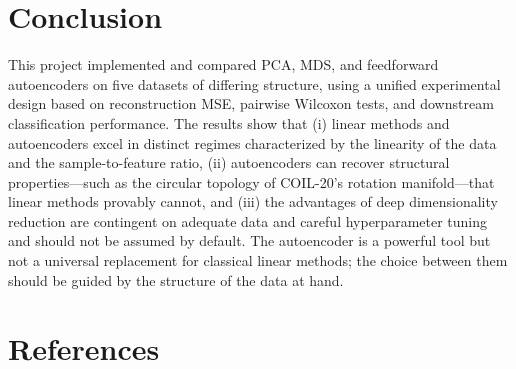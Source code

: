 \documentclass[11pt]{article}
\begin{document}
\section{Conclusion}

This project implemented and compared PCA, MDS, and feedforward autoencoders on five datasets of differing structure, using a unified experimental design based on reconstruction MSE, pairwise Wilcoxon tests, and downstream classification performance. The results show that (i) linear methods and autoencoders excel in distinct regimes characterized by the linearity of the data and the sample-to-feature ratio, (ii) autoencoders can recover structural properties---such as the circular topology of COIL-20's rotation manifold---that linear methods provably cannot, and (iii) the advantages of deep dimensionality reduction are contingent on adequate data and careful hyperparameter tuning and should not be assumed by default. The autoencoder is a powerful tool but not a universal replacement for classical linear methods; the choice between them should be guided by the structure of the data at hand.

\section*{References}
\end{document}
